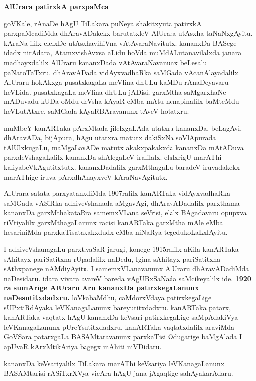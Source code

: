 \documentclass[11pt,a4size]{article}
\begin{document}
\bigskip
\centerline{\textbf{\Large{AlUrara patirxkA parxpaMca}}}
\medskip

goVKale, rAnaDe hAgU TiLakara puNeya shakitxyuta patirxkA
parxpaMcadiMda dhAravADakekx barutatxleV AlUrara utAsxha
taNaNxgAyitu. kAraNa ililx elelxDe utAsxhavihiVna
vAtAvaraNavitutx. kananxDa BASege idadx nirAdara, AtamxvishAvxsa aLidu
hoVda muMdALutanavilalxda janara madhayxdalilx AlUraru kananxDada
vAtAvaraNavanunx beLesalu paNatoTaTxru. dhAravADada vidAyxvadhaRka
saMGada vAcanAlayadalilx AlUraru hokAkxga pusatxkagaLa meVlina dhULu
kaMDu rAnaDeyavaru heVLida, pusatxkagaLa meVlina dhULu jADisi,
garxMtha saMgarxhaNe mADuvadu kUDa oMdu deVsha kAyaR eMba mAtu
nenapinalilx baMteMdu heVLutAtxre. saMGada kAyaRBAravanunx tAveV
hotatxru.

muMbeY-kanARTaka pArxMtada jilelxgaLAda utatxra kananxDa, beLagAvi,
dhAravADa, bijApura, hAgu utatxra matutx dakiSxNa soVlApurada
tAlUlxkugaLu, maMgaLavADe matutx akakxpakakxda kananxDa mAtADuva
parxdeVshagaLalilx kananxDa shAlegaLeV iralilalx. elalxrigU marAThi
kaliyabeVkAgutitxtutx. kananxDadalilx garxMthagaLu baradeV iruvadakekx
marAThige iruva pArxdhAnayxveV kAraNavAgitutx.

AlUrara satata parxyatanxdiMda 1907ralilx kanARTaka vidAyxvadhaRka
saMGada vASiRka adhiveVshanada aMgavAgi, dhAravADadalilx parxthama
kananxDa garxMthakataRra samemxVLana seVrisi, elalx BAgadavaru opupxva
riVtiyalilx garxMthagaLanunx racisi kanARTaka garxMtha mAle eMba
hesariniMda parxkaTisatakakxdudx eMba niNaRya tegedukoLaLxlAyitu.

I adhiveVshanagaLu parxtivaSaR jarugi, konege 1915ralilx aKila
kanARTaka sAhitayx pariSatitxna rUpadalilx \break naDedu, Igina sAhitayx
pariSatitxna sAthxpanege nAMdiyAyitu. I samemxVLanavanunx AlUraru
dhAravADadiMda naDesidaru. idara vivara avareV bareda vAgUBxSaNada
saMcikeyalilx ide. \textbf{1920 ra sumArige AlUraru Aru kananxDa
  patirxkegaLanunx naDesutitxdadxru.} loVkabaMdhu, caMdorxVdaya
patirxkegaLige sUPxtiRdAyaka leVKanagaLanunx
bareyutitxdadxru. kanARTaka patarx, kanARTaka vaqtatx hAgU kananxDa
keVsari patirxkegaLige saMpAdakiVya leVKanagaLanunx pUreYsutitxdadxru.
kanARTaka vaqtatxdalilx araviMda GoVSara patarxgaLa BASAMtaravanunx
parxkaTisi Odugarige baMgAlada I apUvaR kArxMtikAriya bagegx mAhiti
niVDidaru.

kananxDa keVsariyalilx TiLakara marAThi keVsariya leVKanagaLanunx
BASAMtarisi rASiTxrXVya vicAra hAgU jana jAgaqtige sahAyakarAdaru.
\end{document}
